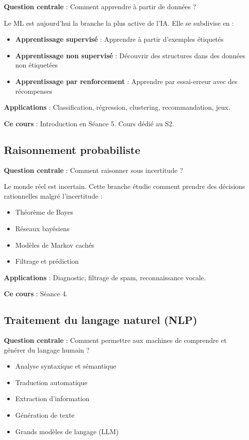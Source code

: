 \documentclass[11pt,a4paper]{article}
\begin{document}
\textbf{Question centrale} : Comment apprendre à partir de données ?

Le ML est aujourd'hui la branche la plus active de l'IA. Elle se subdivise en :
\begin{itemize}
    \item \textbf{Apprentissage supervisé} : Apprendre à partir d'exemples étiquetés
    \item \textbf{Apprentissage non supervisé} : Découvrir des structures dans des données non étiquetées
    \item \textbf{Apprentissage par renforcement} : Apprendre par essai-erreur avec des récompenses
\end{itemize}

\textbf{Applications} : Classification, régression, clustering, recommandation, jeux.

\textbf{Ce cours} : Introduction en Séance 5. Cours dédié au S2.

\subsection{Raisonnement probabiliste}

\textbf{Question centrale} : Comment raisonner sous incertitude ?

Le monde réel est incertain. Cette branche étudie comment prendre des décisions rationnelles malgré l'incertitude :
\begin{itemize}
    \item Théorème de Bayes
    \item Réseaux bayésiens
    \item Modèles de Markov cachés
    \item Filtrage et prédiction
\end{itemize}

\textbf{Applications} : Diagnostic, filtrage de spam, reconnaissance vocale.

\textbf{Ce cours} : Séance 4.

\subsection{Traitement du langage naturel (NLP)}

\textbf{Question centrale} : Comment permettre aux machines de comprendre et générer du langage humain ?

\begin{itemize}
    \item Analyse syntaxique et sémantique
    \item Traduction automatique
    \item Extraction d'information
    \item Génération de texte
    \item Grands modèles de langage (LLM)
\end{itemize}
\end{document}
